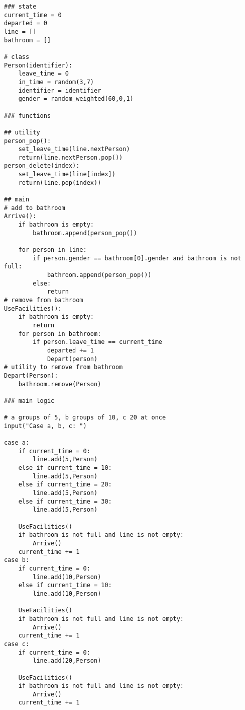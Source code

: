 \documentclass[11pt]{article}
\begin{document}
\begin{lstlisting}
### state
current_time = 0
departed = 0
line = []
bathroom = []

# class
Person(identifier):
	leave_time = 0
	in_time = random(3,7)
	identifier = identifier
	gender = random_weighted(60,0,1)

### functions

## utility
person_pop():
	set_leave_time(line.nextPerson)
	return(line.nextPerson.pop())
person_delete(index):
	set_leave_time(line[index])
	return(line.pop(index))

## main
# add to bathroom
Arrive():
	if bathroom is empty:
		bathroom.append(person_pop())

	for person in line:
		if person.gender == bathroom[0].gender and bathroom is not full:
			bathroom.append(person_pop())
		else:
			return
# remove from bathroom
UseFacilities():
	if bathroom is empty:
		return
	for person in bathroom:
		if person.leave_time == current_time
			departed += 1
			Depart(person)
# utility to remove from bathroom
Depart(Person):
	bathroom.remove(Person)

### main logic

# a groups of 5, b groups of 10, c 20 at once
input("Case a, b, c: ")

case a:
	if current_time = 0:
		line.add(5,Person)
	else if current_time = 10:
		line.add(5,Person)
	else if current_time = 20:
		line.add(5,Person)
	else if current_time = 30:
		line.add(5,Person)

	UseFacilities()
	if bathroom is not full and line is not empty:
		Arrive()
	current_time += 1
case b:
	if current_time = 0:
		line.add(10,Person)
	else if current_time = 10:
		line.add(10,Person)

	UseFacilities()
	if bathroom is not full and line is not empty:
		Arrive()
	current_time += 1
case c:
	if current_time = 0:
		line.add(20,Person)

	UseFacilities()
	if bathroom is not full and line is not empty:
		Arrive()
	current_time += 1
\end{lstlisting}
\end{document}
